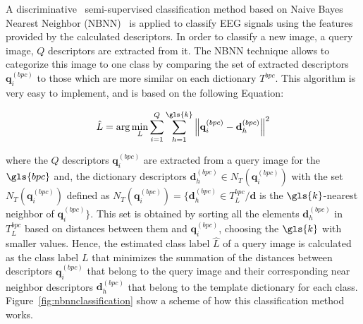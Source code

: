 A discriminative~\cite{WolpawJonathanR2012} semi-supervised classification method based on Naive Bayes Nearest Neighbor (NBNN)~\cite{Boiman2008} is applied to classify EEG signals using the features provided by the calculated descriptors. In order to classify a new image, a query image, $Q$ descriptors are extracted from it.  The NBNN technique allows to categorize this image to one class by comparing the set of extracted descriptors $\mathbf{q}_{i}^{(bpc)}$ to those which are more similar on each dictionary $T^{bpc}$.  This algorithm is very easy to implement, and is based on the following Equation:

\begin{equation}
\hat{L} = \arg \min_{L} \sum_{i=1}^{Q} \sum_{h=1}^{\gls{k}} {\left\lVert \mathbf{q}_{i}^{(bpc)} -  \mathbf{d}_{h}^{(bpc)} \right\rVert}  ^{2} 
\label{eq:classification}
\end{equation}

\noindent where the $Q$ descriptors $ \mathbf{q}_{i}^{(bpc)} $ are extracted from a query image for the $\gls{bpc}$ and, the dictionary descriptors  $\mathbf{d}_{h}^{(bpc)} \in N_T(  \mathbf{q}_{i}^{(bpc)} )$ with the set $N_T(  \mathbf{q}_{i}^{(bpc)} ) $ defined as $N_T(  \mathbf{q}_{i}^{(bpc)} ) = \{ \mathbf{d}_{h}^{(bpc)} \in T_{L}^{bpc} / \mathbf{d} $ is the $\gls{k}$-nearest neighbor of $  \mathbf{q}_{i}^{(bpc)} \}$.  This set is obtained by sorting all the elements $ \mathbf{d}_{h}^{(bpc)} $ in $T_{L}^{bpc}$ based on distances between them and $\mathbf{q}_{i}^{(bpc)}$, choosing the $\gls{k}$ with smaller values.  Hence, the estimated class label $\hat{L}$ of a query image is calculated as the class label $L$ that minimizes the summation of the distances between descriptors $\mathbf{q}_{i}^{(bpc)}$ that belong to the query image and their corresponding near neighbor descriptors $\mathbf{d}_{h}^{(bpc)} $  that belong to the template dictionary for each class. Figure~\ref{fig:nbnnclassification} show a scheme of how this classification method works.

